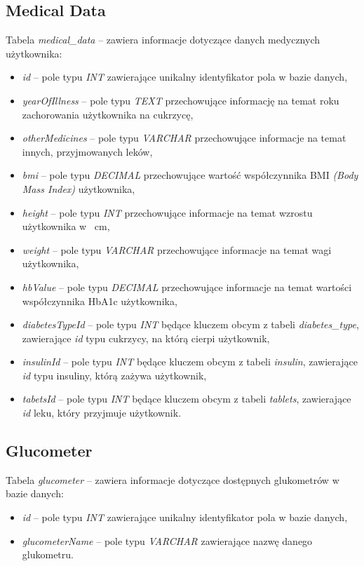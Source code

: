 \subsection{Medical Data}
Tabela \textit{medical\_data} -- zawiera informacje dotyczące danych medycznych użytkownika:
\begin{itemize}
	\item \textit{id} -- pole typu \textit{INT} zawierające unikalny identyfikator pola w bazie danych,
	\item \textit{yearOfIllness} -- pole typu \textit{TEXT} przechowujące informację na temat roku zachorowania użytkownika na cukrzycę,
	\item \textit{otherMedicines} -- pole typu \textit{VARCHAR}  przechowujące informacje na temat innych, przyjmowanych leków,
	\item \textit{bmi} -- pole typu \textit{DECIMAL} przechowujące wartość współczynnika BMI \textit{(Body Mass Index)} użytkownika,
	\item \textit{height} -- pole typu \textit{INT} przechowujące informacje na temat wzrostu użytkownika w~ cm,
	\item \textit{weight} -- pole typu \textit{VARCHAR} przechowujące informacje na temat wagi użytkownika,
	\item \textit{hbValue} -- pole typu \textit{DECIMAL} przechowujące informacje na temat wartości współczynnika HbA1c użytkownika,
	\item \textit{diabetesTypeId} -- pole typu \textit{INT} będące kluczem obcym z tabeli \textit{diabetes\_type}, zawierające \textit{id} typu cukrzycy, na którą cierpi użytkownik,
	\item \textit{insulinId} -- pole typu \textit{INT} będące kluczem obcym z tabeli \textit{insulin}, zawierające \textit{id} typu insuliny, którą zażywa użytkownik,
	\item \textit{tabetsId} -- pole typu \textit{INT} będące kluczem obcym z tabeli \textit{tablets}, zawierające \textit{id} leku, który przyjmuje użytkownik.
\end{itemize}

\subsection{Glucometer}
Tabela \textit{glucometer} -- zawiera informacje dotyczące dostępnych glukometrów w bazie danych:
\begin{itemize}
	\item \textit{id} -- pole typu \textit{INT} zawierające unikalny identyfikator pola w bazie danych,
	\item \textit{glucometerName} -- pole typu \textit{VARCHAR} zawierające nazwę danego glukometru.
\end{itemize}

